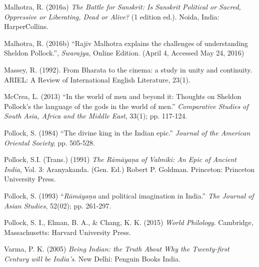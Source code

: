 \begin{thebibliography}{99}
  Malhotra, R. (2016a) \textit{The Battle for Sanskrit: Is Sanskrit Political or Sacred, Oppressive or Liberating, Dead or Alive?} (1 edition ed.). Noida, India: HarperCollins.

  Malhotra, R. (2016b) “Rajiv Malhotra explains the challenges of understanding Sheldon Pollock.”, \textit{Swarajya}, Online Edition. (April 4, Accessed May 24, 2016)

  Massey, R. (1992). From Bharata to the cinema: a study in unity and continuity. ARIEL: A Review of International English Literature, 23(1).

  McCrea, L. (2013) “In the world of men and beyond it: Thoughts on Sheldon Pollock’s the language of the gods in the world of men.” \textit{Comparative Studies of South Asia, Africa and the Middle East}, 33(1); pp. 117-124.

  Pollock, S. (1984) “The divine king in the Indian epic.” \textit{Journal of the American Oriental Society}; pp. 505-528.

  Pollock, S.I. (Trans.) (1991) \textit{The Rāmāyaṇa of Valmiki: An Epic of Ancient India}, Vol. 3: Aranyakanda. (Gen. Ed.) Robert P. Goldman. Princeton: Princeton University Press.

  Pollock, S. (1993) “\textit{Rāmāyaṇa} and political imagination in India.” \textit{The Journal of Asian Studies}, 52(02); pp. 261-297.

  Pollock, S. I., Elman, B. A., \& Chang, K. K. (2015) \textit{World Philology}. Cambridge, Massachusetts: Harvard University Press.

  Varma, P. K. (2005) \textit{Being Indian: the Truth About Why the Twenty-first Century will be India's}. New Delhi: Penguin Books India.

 \end{thebibliography}

\theendnotes

